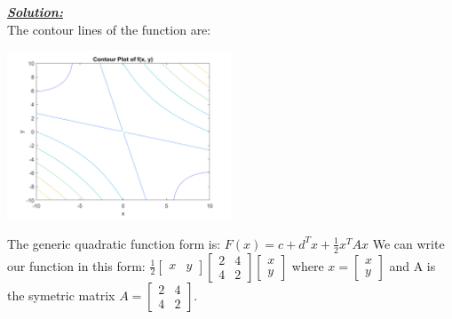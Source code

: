 \documentclass{article}
\begin{document}
\noindent \underline{\textbf{\textit{Solution:}}}
\\
The contour lines of the function are:
  \begin{center} \includegraphics[width=0.5\textwidth]{Problem1_Contour.png} \end{center}
The generic quadratic function form is:
  ${F(x) = c + d^Tx + \frac{1}{2}x^TAx}$
  We can write our function in this form:
  $
  \frac{1}{2}
  \begin{bmatrix}
    x & y
  \end{bmatrix}
  \begin{bmatrix}
    2 & 4 \\
    4 & 2
  \end{bmatrix}
  \begin{bmatrix}
    x \\
    y
  \end{bmatrix}
  $
  where $ x = 
  \begin{bmatrix}
    x \\
    y
  \end{bmatrix}$
  and A is the symetric matrix $A =   
  \begin{bmatrix}
    2 & 4 \\
    4 & 2
  \end{bmatrix}$. \\ 
\end{document}
